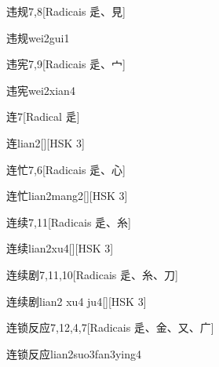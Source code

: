\begin{entry}{违规}{7,8}[Radicais ⾡、⾒]
  \begin{phonetics}{违规}{wei2gui1}
  \end{phonetics}
\end{entry}

\begin{entry}{违宪}{7,9}[Radicais ⾡、⼧]
  \begin{phonetics}{违宪}{wei2xian4}
  \end{phonetics}
\end{entry}

\begin{entry}{连}{7}[Radical ⾡]
  \begin{phonetics}{连}{lian2}[][HSK 3]
  \end{phonetics}
\end{entry}

\begin{entry}{连忙}{7,6}[Radicais ⾡、⼼]
  \begin{phonetics}{连忙}{lian2mang2}[][HSK 3]
  \end{phonetics}
\end{entry}

\begin{entry}{连续}{7,11}[Radicais ⾡、⽷]
  \begin{phonetics}{连续}{lian2xu4}[][HSK 3]
  \end{phonetics}
\end{entry}

\begin{entry}{连续剧}{7,11,10}[Radicais ⾡、⽷、⼑]
  \begin{phonetics}{连续剧}{lian2 xu4 ju4}[][HSK 3]
  \end{phonetics}
\end{entry}

\begin{entry}{连锁反应}{7,12,4,7}[Radicais ⾡、⾦、⼜、⼴]
  \begin{phonetics}{连锁反应}{lian2suo3fan3ying4}
  \end{phonetics}
\end{entry}

